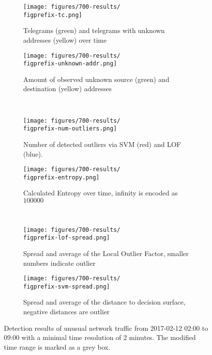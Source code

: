 \begin{figure}[H]
	\newcommand{\figwith}{0.49\textwidth}
	\newcommand{\figprefix}{unusual}
	\centering
	
	\begin{subfigure}[b]{\figwith}
		\texttt{[image: figures/700-results/\\figprefix-tc.png]}
		\caption{Telegrams (green) and telegrams with unknown addresses (yellow) over time}
		\label{fig:results:\figprefix:tc}
	\end{subfigure}
	\hfil
	\begin{subfigure}[b]{\figwith}
		\texttt{[image: figures/700-results/\\figprefix-unknown-addr.png]}
		\caption{Amount of observed unknown source (green) and destination (yellow) addresses}
		\label{fig:results:\figprefix:addr}
	\end{subfigure}
	\\[1.5mm]
	\begin{subfigure}[b]{\figwith}
		\texttt{[image: figures/700-results/\\figprefix-num-outliers.png]}
		\caption{Number of detected outliers via SVM (red) and LOF (blue).}
		\label{fig:results:\figprefix:outlier}
	\end{subfigure}
	\hfil
	\begin{subfigure}[b]{\figwith}
		\texttt{[image: figures/700-results/\\figprefix-entropy.png]}
		\caption{Calculated Entropy over time, infinity is encoded as $100 000$}
		\label{fig:results:\figprefix:entropy}
	\end{subfigure}
	\\[1.5mm]
	\begin{subfigure}[b]{\figwith}
		\texttt{[image: figures/700-results/\\figprefix-lof-spread.png]}
		\caption{Spread and average of the Local Outlier Factor, smaller numbers indicate outlier}
		\label{fig:results:\figprefix:lof}
	\end{subfigure}
	\hfil
	\begin{subfigure}[b]{\figwith}
		\texttt{[image: figures/700-results/\\figprefix-svm-spread.png]}
		\caption{Spread and average of the distance to decision surface, negative distances are outlier}
		\label{fig:results:\figprefix:svm}
	\end{subfigure}
	
	\caption[Detection results of unusual network traffic]{Detection results of unusual network traffic from 2017-02-12 02:00 to 09:00 with a minimal time resolution of 2 minutes. The modified time range is marked as a grey box.}
	\label{fig:results:\figprefix}
	
\end{figure}

